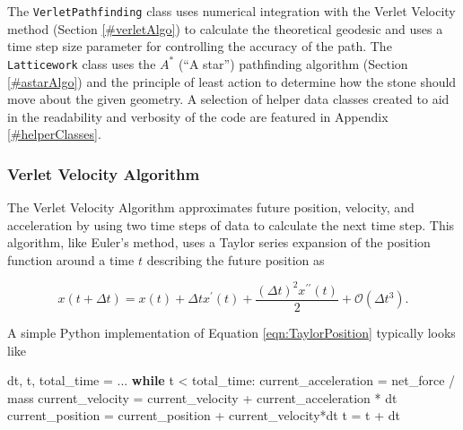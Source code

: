 \documentclass[
]{article}
\newenvironment{Shaded}{}{}
\newcommand{\ControlFlowTok}[1]{\textcolor[rgb]{0.00,0.44,0.13}{\textbf{#1}}}
\newcommand{\NormalTok}[1]{#1}
\newcommand{\OperatorTok}[1]{\textcolor[rgb]{0.40,0.40,0.40}{#1}}
\begin{document}
The \texttt{VerletPathfinding} class uses numerical integration with the
Verlet Velocity method (Section \ref{#verletAlgo}) to calculate the
theoretical geodesic and uses a time step size parameter for controlling
the accuracy of the path. The \texttt{Latticework} class uses the
\(A^*\) (``A star'') pathfinding algorithm (Section \ref{#astarAlgo})
and the principle of least action to determine how the stone should move
about the given geometry. A selection of helper data classes created to
aid in the readability and verbosity of the code are featured in
Appendix \ref{#helperClasses}.

\hypertarget{verletAlgo}{%
\subsubsection{Verlet Velocity Algorithm}\label{verletAlgo}}

The Verlet Velocity Algorithm approximates future position, velocity,
and acceleration by using two time steps of data to calculate the next
time step. This algorithm, like Euler's method, uses a Taylor series
expansion of the position function around a time \(t\) describing the
future position as

\begin{equation}\label{eqn:TaylorPosition}
x(t + \Delta t) = x(t) + \Delta t x^\prime (t) + \frac{(\Delta t)^2 x^{\prime\prime} (t)}{2} + \mathcal{O}(\Delta t^3).
\end{equation}

A simple Python implementation of Equation \ref{eqn:TaylorPosition}
typically looks like

\begin{Shaded}
\begin{Highlighting}[]
\NormalTok{dt, t, total\_time }\OperatorTok{=}\NormalTok{ ...}
\ControlFlowTok{while}\NormalTok{ t }\OperatorTok{\textless{}}\NormalTok{ total\_time:}
\NormalTok{    current\_acceleration }\OperatorTok{=}\NormalTok{ net\_force }\OperatorTok{/}\NormalTok{ mass}
\NormalTok{    current\_velocity }\OperatorTok{=}\NormalTok{ current\_velocity }\OperatorTok{+}\NormalTok{ current\_acceleration }\OperatorTok{*}\NormalTok{ dt}
\NormalTok{    current\_position }\OperatorTok{=}\NormalTok{ current\_position }\OperatorTok{+}\NormalTok{ current\_velocity}\OperatorTok{*}\NormalTok{dt}
\NormalTok{    t }\OperatorTok{=}\NormalTok{ t }\OperatorTok{+}\NormalTok{ dt}
\end{Highlighting}
\end{Shaded}
\end{document}
